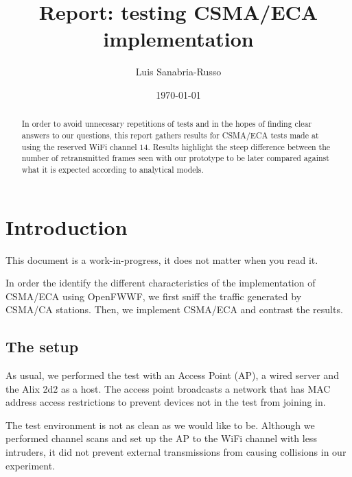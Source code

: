 \documentclass[a4paper]{journal}
\begin{document}
\title{Report: testing CSMA/ECA implementation}
\author{Luis Sanabria-Russo}
\date{\today}
\maketitle

\begin{abstract}
In order to avoid unnecesary repetitions of tests and in the hopes of finding clear answers to our questions, this report gathers results for CSMA/ECA tests made at using the reserved WiFi channel $14$. Results highlight the steep difference between the number of retransmitted frames seen with our prototype to be later compared against what it is expected according to analytical models.
\end{abstract}

\section{Introduction}
This document is a work-in-progress, it does not matter when you read it.

In order the identify the different characteristics of the implementation of CSMA/ECA using OpenFWWF, we first sniff the traffic generated by CSMA/CA stations. Then, we implement CSMA/ECA and contrast the results.

\subsection{The setup}
As usual, we performed the test with an Access Point (AP), a wired server and the Alix 2d2 as a host. The access point broadcasts a network that has MAC address access restrictions to prevent devices not in the test from joining in.

The test environment is not as clean as we would like to be. Although we performed channel scans and set up the AP to the WiFi channel with less intruders, it did not prevent external transmissions from causing collisions in our experiment.
\end{document}
